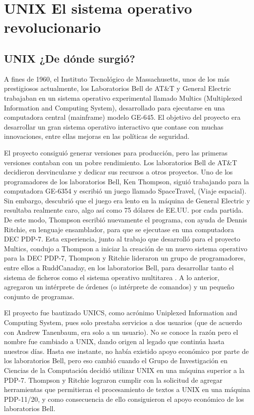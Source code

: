 \chapter*{UNIX El sistema operativo revolucionario}

\section*{UNIX ¿De dónde surgió?}
A fines de 1960, el Instituto Tecnológico de Massachusetts, unos  de los más prestigiosos actualmente, los Laboratorios Bell de AT&T y General Electric trabajaban en un sistema 
operativo experimental llamado Multics (Multiplexed Information and Computing System), desarrollado para ejecutarse en una computadora central (mainframe) modelo GE-645. El 
objetivo del proyecto era desarrollar un gran sistema operativo interactivo que contase con muchas innovaciones, entre ellas mejoras en las políticas de seguridad.
 
El proyecto consiguió generar versiones para producción, pero las primeras versiones contaban con un pobre rendimiento. Los laboratorios Bell de AT&T decidieron desvincularse y 
dedicar sus recursos a otros proyectos. Uno de los programadores de los laboratorios Bell, Ken Thompson, siguió trabajando para la computadora GE-6354 y escribió un juego llamado 
SpaceTravel, (Viaje espacial). Sin embargo, descubrió que el juego era lento en la máquina de General Electric y resultaba realmente caro, algo así como 75 dólares de EE.UU. por 
cada partida. De este modo, Thompson escribió nuevamente el programa, con ayuda de Dennis Ritchie, en lenguaje ensamblador, para que se ejecutase en una computadora DEC PDP-7. 
Esta experiencia, junto al trabajo que desarrolló para el proyecto Multics, condujo a Thompson a iniciar la creación de un nuevo sistema operativo para la DEC PDP-7, Thompson y 
Ritchie lideraron un grupo de programadores, entre ellos a RuddCanaday, en los laboratorios Bell, para desarrollar tanto el sistema de ficheros como el sistema operativo 
multitarea . A lo anterior, agregaron un intérprete de órdenes (o intérprete de comandos) y un pequeño conjunto de programas.
 
El proyecto fue bautizado UNICS, como acrónimo Uniplexed Information and Computing System, pues solo prestaba servicios a dos usuarios (que de acuerdo con Andrew Tanenbaum, era 
solo a un usuario). No se conoce la razón pero el nombre fue cambiado a UNIX, dando origen al legado que continúa hasta nuestros días. Hasta ese instante, no había existido  
apoyo económico por parte de los laboratorios Bell, pero eso cambió cuando el Grupo de Investigación en Ciencias de la Computación decidió utilizar UNIX en una máquina superior a 
la PDP-7. Thompson y Ritchie lograron cumplir con la solicitud de agregar herramientas que permitieran el procesamiento de textos a UNIX en una máquina PDP-11/20, y como 
consecuencia de ello consiguieron el apoyo económico de los laboratorios Bell.
 
